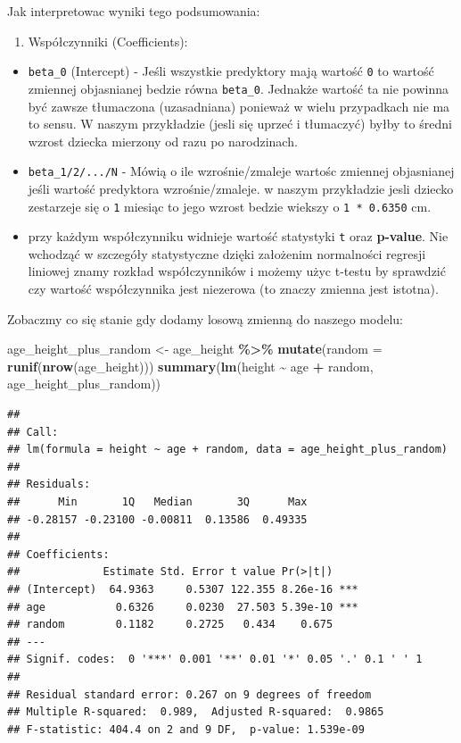\documentclass[
]{article}
\newenvironment{Shaded}{\begin{snugshade}}{\end{snugshade}}
\newcommand{\DataTypeTok}[1]{\textcolor[rgb]{0.13,0.29,0.53}{#1}}
\newcommand{\KeywordTok}[1]{\textcolor[rgb]{0.13,0.29,0.53}{\textbf{#1}}}
\newcommand{\NormalTok}[1]{#1}
\newcommand{\OperatorTok}[1]{\textcolor[rgb]{0.81,0.36,0.00}{\textbf{#1}}}
\newcommand{\StringTok}[1]{\textcolor[rgb]{0.31,0.60,0.02}{#1}}
\providecommand{\tightlist}{%
  \setlength{\itemsep}{0pt}\setlength{\parskip}{0pt}}
\begin{document}
Jak interpretowac wyniki tego podsumowania:

\begin{enumerate}
\def\labelenumi{\arabic{enumi}.}
\tightlist
\item
  Współczynniki (Coefficients):
\end{enumerate}

\begin{itemize}
\item
  \texttt{beta\_0} (Intercept) - Jeśli wszystkie predyktory mają wartość
  \texttt{0} to wartość zmiennej objasnianej bedzie równa
  \texttt{beta\_0}. Jednakże wartość ta nie powinna być zawsze
  tłumaczona (uzasadniana) ponieważ w wielu przypadkach nie ma to sensu.
  W naszym przykładzie (jesli się uprzeć i tłumaczyć) byłby to średni
  wzrost dziecka mierzony od razu po narodzinach.
\item
  \texttt{beta\_1/2/.../N} - Mówią o ile wzrośnie/zmaleje wartośc
  zmiennej objasnianej jeśli wartość predyktora wzrośnie/zmaleje. w
  naszym przykładzie jesli dziecko zestarzeje się o \texttt{1} miesiąc
  to jego wzrost bedzie wiekszy o \texttt{1\ *\ 0.6350} cm.
\item
  przy każdym współczynniku widnieje wartość statystyki \texttt{t} oraz
  \textbf{p-value}. Nie wchodząć w szczegóły statystyczne dzięki
  założenim normalności regresji liniowej znamy rozkład współczynników i
  możemy użyc t-testu by sprawdzić czy wartość współczynnika jest
  niezerowa (to znaczy zmienna jest istotna).
\end{itemize}

Zobaczmy co się stanie gdy dodamy losową zmienną do naszego modelu:

\begin{Shaded}
\begin{Highlighting}[]
\NormalTok{age\_height\_plus\_random  \textless{}{-}}\StringTok{ }\NormalTok{age\_height }\OperatorTok{\%\textgreater{}\%}
\StringTok{  }\KeywordTok{mutate}\NormalTok{(}\DataTypeTok{random =} \KeywordTok{runif}\NormalTok{(}\KeywordTok{nrow}\NormalTok{(age\_height)))}
\KeywordTok{summary}\NormalTok{(}\KeywordTok{lm}\NormalTok{(height }\OperatorTok{\textasciitilde{}}\StringTok{ }\NormalTok{age }\OperatorTok{+}\StringTok{ }\NormalTok{random, age\_height\_plus\_random))}
\end{Highlighting}
\end{Shaded}

\begin{verbatim}
## 
## Call:
## lm(formula = height ~ age + random, data = age_height_plus_random)
## 
## Residuals:
##      Min       1Q   Median       3Q      Max 
## -0.28157 -0.23100 -0.00811  0.13586  0.49335 
## 
## Coefficients:
##             Estimate Std. Error t value Pr(>|t|)    
## (Intercept)  64.9363     0.5307 122.355 8.26e-16 ***
## age           0.6326     0.0230  27.503 5.39e-10 ***
## random        0.1182     0.2725   0.434    0.675    
## ---
## Signif. codes:  0 '***' 0.001 '**' 0.01 '*' 0.05 '.' 0.1 ' ' 1
## 
## Residual standard error: 0.267 on 9 degrees of freedom
## Multiple R-squared:  0.989,  Adjusted R-squared:  0.9865 
## F-statistic: 404.4 on 2 and 9 DF,  p-value: 1.539e-09
\end{verbatim}
\end{document}
